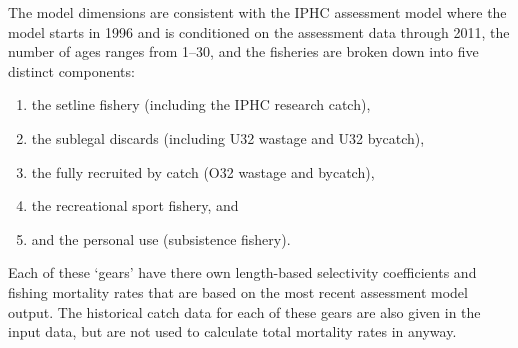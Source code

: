 The model dimensions are consistent with the IPHC assessment model where the model starts in 1996 and is conditioned on the assessment data through 2011, the number of ages ranges from 1--30, and the fisheries are broken down into five distinct components: 
\begin{enumerate}
	\item the setline fishery (including the IPHC research catch),
	\item the sublegal discards (including U32 wastage and U32 bycatch),
	\item the fully recruited by catch (O32 wastage and bycatch),
	\item the recreational sport fishery, and
	\item and the personal use (subsistence fishery).
\end{enumerate}
Each of these `gears' have there own length-based selectivity coefficients and fishing mortality rates that are based on the most recent assessment model output.  The historical catch data for each of these gears are also given in the input data, but are not used to calculate total mortality rates in anyway.  





